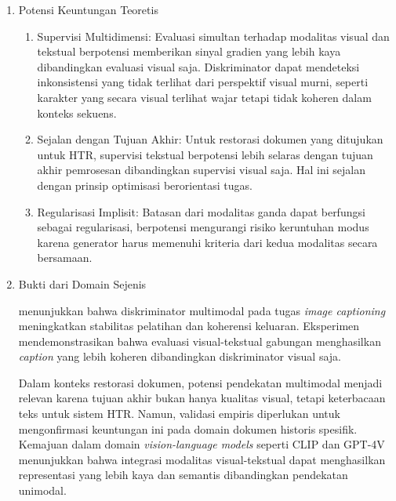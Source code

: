\begin{enumerate}[leftmargin=*, labelindent=0pt, itemsep=1ex, topsep=0pt]

\item Potensi Keuntungan Teoretis

\begin{enumerate}[leftmargin=1.5em, labelsep=0.5em, itemindent=0pt, label=\alph*., topsep=0pt, parsep=0pt, itemsep=0pt]
      \item Supervisi Multidimensi: \mbox{} Evaluasi simultan terhadap modalitas visual dan tekstual berpotensi memberikan sinyal gradien yang lebih kaya dibandingkan evaluasi visual saja. Diskriminator dapat mendeteksi inkonsistensi yang tidak terlihat dari perspektif visual murni, seperti karakter yang secara visual terlihat wajar tetapi tidak koheren dalam konteks sekuens.

      \item Sejalan dengan Tujuan Akhir: \mbox{} Untuk restorasi dokumen yang ditujukan untuk HTR, supervisi tekstual berpotensi lebih selaras dengan tujuan akhir pemrosesan dibandingkan supervisi visual saja. Hal ini sejalan dengan prinsip optimisasi berorientasi tugas.

      \item Regularisasi Implisit: \mbox{} Batasan dari modalitas ganda dapat berfungsi sebagai regularisasi, berpotensi mengurangi risiko keruntuhan modus karena generator harus memenuhi kriteria dari kedua modalitas secara bersamaan.
\end{enumerate}

\item Bukti dari Domain Sejenis

\textcite{wei2022} menunjukkan bahwa diskriminator multimodal pada tugas \textit{image captioning} meningkatkan stabilitas pelatihan dan koherensi keluaran. Eksperimen mendemonstrasikan bahwa evaluasi visual-tekstual gabungan menghasilkan \textit{caption} yang lebih koheren dibandingkan diskriminator visual saja.

Dalam konteks restorasi dokumen, potensi pendekatan multimodal menjadi relevan karena tujuan akhir bukan hanya kualitas visual, tetapi keterbacaan teks untuk sistem HTR. Namun, validasi empiris diperlukan untuk mengonfirmasi keuntungan ini pada domain dokumen historis spesifik. Kemajuan dalam domain \textit{vision-language models} seperti CLIP dan GPT-4V menunjukkan bahwa integrasi modalitas visual-tekstual dapat menghasilkan representasi yang lebih kaya dan semantis dibandingkan pendekatan unimodal.

\end{enumerate}

